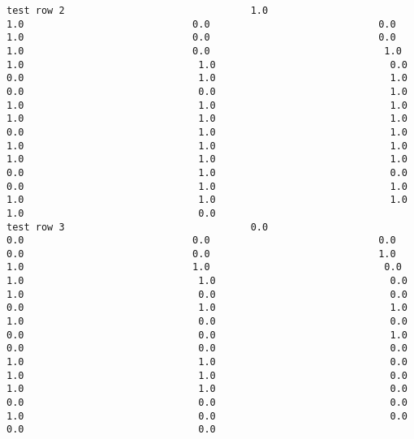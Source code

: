 \documentclass[11pt]{article}
\begin{document}
\begin{verbatim}
test row 2                                1.0                             1.0                             0.0                             0.0                             1.0                             0.0                             0.0                             1.0                             0.0                              1.0                              1.0                              1.0                              0.0                              0.0                              1.0                              1.0                              0.0                              0.0                              1.0                              1.0                              1.0                              1.0                              1.0                              1.0                              1.0                              0.0                              1.0                              1.0                              1.0                              1.0                              1.0                              1.0                              1.0                              1.0                              0.0                              1.0                              0.0                              0.0                              1.0                              1.0                              1.0                              1.0                              1.0                              1.0                              0.0
test row 3                                0.0                             0.0                             0.0                             0.0                             0.0                             0.0                             1.0                             1.0                             1.0                              0.0                              1.0                              1.0                              0.0                              1.0                              0.0                              0.0                              0.0                              1.0                              1.0                              1.0                              0.0                              0.0                              0.0                              0.0                              1.0                              0.0                              0.0                              0.0                              1.0                              1.0                              0.0                              1.0                              1.0                              0.0                              1.0                              1.0                              0.0                              0.0                              0.0                              0.0                              1.0                              0.0                              0.0                              0.0                              0.0

\end{verbatim}
\end{document}
